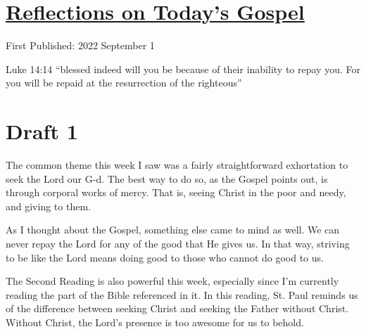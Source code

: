 \documentclass[12pt]{article}[titlepage]
\newcommand{\say}[1]{``#1''}
\newcommand{\1}{\={a}}
\newcommand{\2}{\={e}}
\newcommand{\3}{\={\i}}
\newcommand{\4}{\=o}
\newcommand{\5}{\=u}
\newcommand{\6}{\={A}}
\renewcommand{\,}{\textsuperscript{,}}
\begin{document}
\doublespacing
\section{\href{reflections-on-readings-22-ordinary-c-22.html}{Reflections on Today's Gospel}}
First Published: 2022 September 1

Luke 14:14 \say{blessed indeed will you be because of their inability to repay you. For you will be repaid at the resurrection of the righteous}

\section{Draft 1}
The common theme this week I saw was a fairly straightforward exhortation to seek the Lord our G-d.
The best way to do so, as the Gospel points out, is through corporal works of mercy.
That is, seeing Christ in the poor and needy, and giving to them.

As I thought about the Gospel, something else came to mind as well.
We can never repay the Lord for any of the good that He gives us.
In that way, striving to be like the Lord means doing good to those who cannot do good to us.

The Second Reading is also powerful this week, especially since I'm currently reading the part of the Bible referenced in it.
In this reading, St. Paul reminds us of the difference between seeking Christ and seeking the Father without Christ.
Without Christ, the Lord's presence is too awesome for us to behold.
\end{document}
